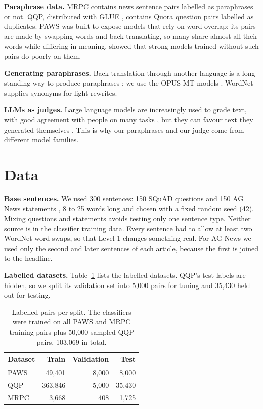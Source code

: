 \documentclass[11pt]{article}
\begin{document}
\textbf{Paraphrase data.} MRPC \citep{dolan2005} contains news sentence pairs labelled as paraphrases or not. QQP, distributed with GLUE \citep{wang2018}, contains Quora question pairs labelled as duplicates. PAWS \citep{zhang2019} was built to expose models that rely on word overlap: its pairs are made by swapping words and back-translating, so many share almost all their words while differing in meaning. \citet{zhang2019} showed that strong models trained without such pairs do poorly on them.

\textbf{Generating paraphrases.} Back-translation through another language is a long-standing way to produce paraphrases \citep{mallinson2017}; we use the OPUS-MT models \citep{tiedemann2020}. WordNet \citep{miller1995} supplies synonyms for light rewrites.

\textbf{LLMs as judges.} Large language models are increasingly used to grade text, with good agreement with people on many tasks \citep{zheng2023}, but they can favour text they generated themselves \citep{panickssery2024}. This is why our paraphrases and our judge come from different model families.

\section{Data}
\textbf{Base sentences.} We used 300 sentences: 150 SQuAD questions \citep{rajpurkar2016} and 150 AG News statements \citep{zhang2015}, 8 to 25 words long and chosen with a fixed random seed (42). Mixing questions and statements avoids testing only one sentence type. Neither source is in the classifier training data. Every sentence had to allow at least two WordNet word swaps, so that Level 1 changes something real. For AG News we used only the second and later sentences of each article, because the first is joined to the headline.

\textbf{Labelled datasets.} Table~\ref{tab:data} lists the labelled datasets. QQP's test labels are hidden, so we split its validation set into 5,000 pairs for tuning and 35,430 held out for testing.

\begin{table}[t]
\centering\small
\begin{tabular}{@{}lrrr@{}}
\toprule
\textbf{Dataset} & \textbf{Train} & \textbf{Validation} & \textbf{Test} \\
\midrule
PAWS & 49,401 & 8,000 & 8,000 \\
QQP & 363,846 & 5,000 & 35,430 \\
MRPC & 3,668 & 408 & 1,725 \\
\bottomrule
\end{tabular}
\caption{Labelled pairs per split. The classifiers were trained on all PAWS and MRPC training pairs plus 50,000 sampled QQP pairs, 103,069 in total.}
\label{tab:data}
\end{table}
\end{document}
